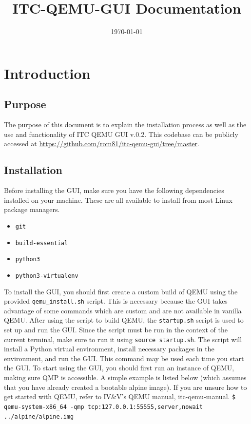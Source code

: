\documentclass{article}
\title{ITC-QEMU-GUI \version{} Documentation}
\author{}
\date{\today}
\newcommand{\version}{v.0.2}
\newcommand{\code}[1]{\texttt{#1}}
\begin{document}
\maketitle
\tableofcontents



\begin{versionhistory}
\end{versionhistory}

\newpage

\section{Introduction}

\subsection{Purpose}
The purpose of this document is to explain the installation process as well as the use and functionality of ITC QEMU GUI \version{}. This codebase can be publicly accessed at \url{https://github.com/rom81/itc-qemu-gui/tree/master}.

\subsection{Installation}
Before installing the GUI, make sure you have the following dependencies installed on your machine. These are all available to install from most Linux package managers.
\begin{itemize}
    \item \code{git}
    \item \code{build-essential}
    \item \code{python3}
    \item \code{python3-virtualenv}
\end{itemize}

To install the GUI, you should first create a custom build of QEMU using the provided \code{qemu\_install.sh} script. This is necessary because the GUI takes advantage of some commands which are custom and are not available in vanilla QEMU. After using the script to build QEMU, the \code{startup.sh} script is used to set up and run the GUI. Since the script must be run in the context of the current terminal, make sure to run it using \code{source startup.sh}. The script will install a Python virtual environment, install necessary packages in the environment, and run the GUI. This command may be used each time you start the GUI.
To start using the GUI, you should first run an instance of QEMU, making sure QMP is accessible. A simple example is listed below (which assumes that you have already created a bootable alpine image). If you are unsure how to get started with QEMU, refer to IV\&V's QEMU manual, itc-qemu-manual. \newline \newline
\code{\$ qemu-system-x86\_64 -qmp tcp:127.0.0.1:55555,server,nowait  ../alpine/alpine.img}
\newline
\end{document}
